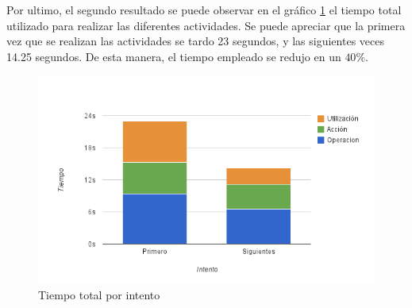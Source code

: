 Por ultimo, el segundo resultado se puede observar en el gráfico \ref{fig:interfaz_tiempo_total_actividades} el tiempo total utilizado para realizar las diferentes actividades. Se puede apreciar que la primera vez que se realizan las actividades se tardo 23 segundos, y las siguientes veces 14.25 segundos. De esta manera, el tiempo empleado se redujo en un $40\%$.
 
\begin{figure}[ht!]
\centering
\includegraphics[scale=0.8]{resultados/imagenes/interfaz_tiempo_total_actividades.png}
\caption{Tiempo total por intento}
\label{fig:interfaz_tiempo_total_actividades}
\end{figure}